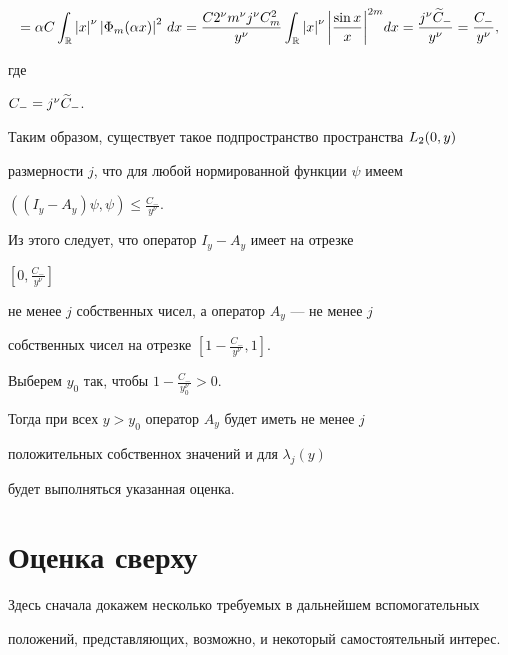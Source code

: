 \begin{pf}
\begin{multline*}
%


=\alpha C \int_{\Bbb R}\abs{x}^{\nu}\abs{\Phi_{m}(\alpha x)}^{2}\,dx=


\frac{C 2^{\nu} m^{\nu} j^{\nu} C_{m}^{2}}{y^{\nu}}


\int_{\Bbb R}\abs{x}^{\nu}\bigg|\frac{\sin x}{x}\bigg|^{2 m}dx=


\frac{j^{\nu}\tld{C}_{-}}{y^{\nu}}=\frac{C_{-}}{y^{\nu}},


\end{multline*}


где


$C_{-}=j^{\nu}\widetilde{C}_{-}$.





Таким образом, существует такое подпространство пространства $L_{2}(0,y)$ 


размерности $j$, что для любой нормированной функции $\psi$ имеем


$((I_{y}-A_{y}) \psi,\psi ) \leqslant\frac{C_{-}}{y^{\nu}}$. 


Из этого следует, что оператор $I_{y}-A_{y}$ имеет на отрезке 


$ [0,\frac{C_{-}}{y^{\nu}} ]$ 


не менее $j$ собственных чисел, а оператор $A_{y}$ --- не менее $j$ 


собственных чисел на отрезке $ [1-\frac{C_{-}}{y^{\nu}},1 ]$. 


Выберем $y_{0}$ так, чтобы $1-\frac{C_{-}}{y_{0}^{\nu}}>0$. 


Тогда при всех $y>y_{0}$ оператор $A_{y}$ будет иметь не менее $j$ 


положительных собственнох значений и для $\lambda_{j}(y)$ 


будет выполняться указанная оценка.


\end{pf}








\section{Оценка сверху} \label{sec:4}





Здесь сначала докажем несколько требуемых в дальнейшем вспомогательных 


положений, представляющих, возможно, и некоторый самостоятельный интерес.








